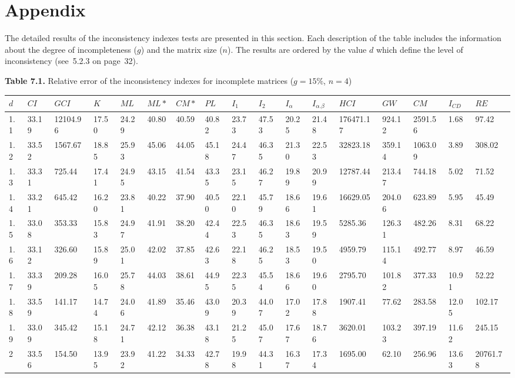 \chapter{Appendix}

The detailed results of the inconsistency indexes tests are presented in this section. Each description of the table includes the information about the degree of incompleteness ($g$) and the matrix size ($n$). The results are ordered by the value $d$ which define the level of inconsistency (see~5.2.3 on page~32).





\newpage
\textbf{Table 7.1.} Relative error of the inconsistency indexes for incomplete matrices ($g=15\%$, $n=4$)
\begin{adjustbox}{angle=90}
  \begin{center}
    \small{
    \begin{tabular}{|l|llllllllllllllll|}
      \hline $d$&$CI$&$GCI$&$K$&$ML$&$ML*$&$CM*$&$PL$&$I_1$&$I_2$&$I_{\alpha}$&$I_{\alpha.\beta}$&$HCI$&$GW$&$CM$&$I_{CD}$&$RE$\\ \hline \hline
1.1&33.19&12104.96&17.50&24.29&40.80&40.59&40.82&23.73&47.53&20.25&21.48&176471.17&924.12&2591.56&1.68&97.42  \\ 
1.2&33.52&1567.67&18.85&25.93&45.06&44.05&45.18&24.47&46.35&21.30&22.53&32823.18&359.14&1063.09&3.89&308.02  \\ 
1.3&33.31&725.44&17.41&24.95&43.15&41.54&43.35&23.15&46.27&19.89&20.99&12787.44&213.47&744.18&5.02&71.52  \\ 
1.4&33.21&645.42&16.20&23.81&40.22&37.90&40.50&22.10&45.79&18.66&19.61&16629.05&204.06&623.89&5.95&45.49  \\ 
1.5&33.08&353.33&15.83&24.97&41.91&38.20&42.44&22.53&46.35&18.63&19.59&5285.36&126.31&482.26&8.31&68.22  \\ 
1.6&33.12&326.60&15.89&25.01&42.02&37.85&42.63&22.18&46.25&18.53&19.50&4959.79&115.14&492.77&8.97&46.59  \\ 
1.7&33.39&209.28&16.05&25.78&44.03&38.61&44.95&22.35&45.54&18.66&19.60&2795.70&101.82&377.33&10.91&52.22  \\ 
1.8&33.59&141.17&14.74&24.06&41.89&35.46&43.09&20.39&44.07&17.02&17.88&1907.41&77.62&283.58&12.05&102.17  \\ 
1.9&33.09&345.42&15.18&24.71&42.12&36.38&43.18&21.25&45.07&17.67&18.76&3620.01&103.23&397.19&11.62&245.15  \\ 
2&33.56&154.50&13.95&23.92&41.22&34.33&42.78&19.98&44.31&16.37&17.34&1695.00&62.10&256.96&13.63&20761.78  \\ 

\end{tabular}}
\end{center}
\end{adjustbox}
